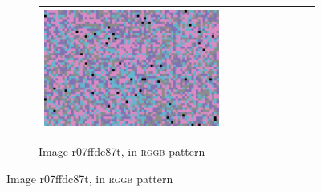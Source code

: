 \documentclass{ipol}
\begin{document}
\begin{figure}[ht]
\begin{subfigure}[t]{\linewidth}
\begin{tabular}{ccccccccc}
                \includegraphics[width=\s]{images/carnival/VNG/bid_j95_64_grids.png}\\
                \bottomrule
        \end{tabular}
        \caption{Image r07ffdc87t, in \textsc{rggb} pattern}
\end{subfigure}
\end{figure}
\end{document}
